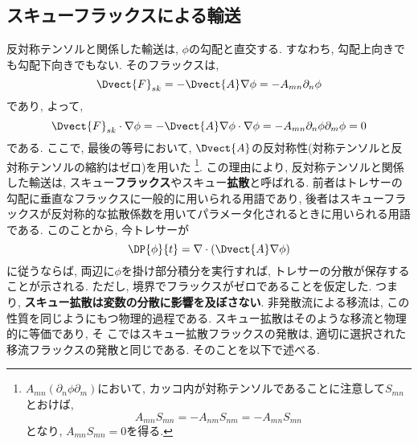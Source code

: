 \subsection{スキューフラックスによる輸送}
反対称テンソルと関係した輸送は, $\phi$の勾配と直交する. 
すなわち, 勾配上向きでも勾配下向きでもない. 
そのフラックスは, 
\begin{equation}
  \Dvect{F}_{sk} = - \Dvect{A} \nabla \phi
  = - A_{mn} \partial_n \phi
\label{eq:skew_flux1}
\end{equation}
であり, 
よって, 
\begin{equation}
  \Dvect{F}_{sk} \cdot \nabla \phi
  = - \Dvect{A} \nabla \phi \cdot \nabla \phi = - A_{mn} \partial_n \phi \partial_m \phi = 0
\end{equation}
である. 
ここで, 最後の等号において, $\Dvect{A}$の反対称性(対称テンソルと反対称テンソルの縮約はゼロ)を用いた%
\footnote{
$A_{mn} (\partial_n \phi \partial_m)$において, カッコ内が対称テンソルであることに注意して$S_{mn}$とおけば, 
$$
A_{mn} S_{mn} = - A_{nm} S_{nm} = - A_{mn} S_{mn}
$$
となり, $A_{mn} S_{mn}=0$を得る. 
}.
この理由により, 反対称テンソルと関係した輸送は, スキュー\textbf{フラックス}やスキュー\textbf{拡散}と呼ばれる. 
前者はトレサーの勾配に垂直なフラックスに一般的に用いられる用語であり, 
後者はスキューフラックスが反対称的な拡散係数を用いてパラメータ化されるときに用いられる用語である. 
このことから, 今トレサーが
\begin{equation}
  \DP{\phi}{t} = \nabla \cdot (\Dvect{A} \nabla \phi)
\end{equation}
に従うならば, 両辺に$\phi$を掛け部分積分を実行すれば, トレサーの分散が保存することが示される. 
ただし, 境界でフラックスがゼロであることを仮定した. 
つまり, \textbf{スキュー拡散は変数の分散に影響を及ぼさない}. 
非発散流による移流は, この性質を同じようにもつ物理的過程である. 
スキュー拡散はそのような移流と物理的に等価であり, そ
こではスキュー拡散フラックスの発散は, 適切に選択された移流フラックスの発散と同じである. 
そのことを以下で述べる. 

